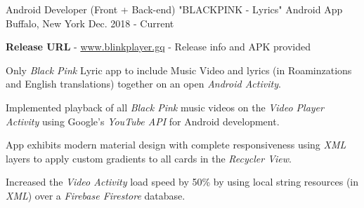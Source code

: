\begin{cventries}
\cventry
    {Android Developer (Front + Back-end)} %
    {"BLACKPINK - Lyrics" Android App} %
    {Buffalo, New York} %
    {Dec. 2018 - Current} %
    {
      \begin{cvitems} %
      {\textbf{Release URL }  -  \href{www.blinkplayer.gq}{www.blinkplayer.gq} - Release info and APK provided }
        \item \item{Only \textit{Black Pink} Lyric app to include Music Video and lyrics (in Roaminzations and English translations) together on an open \textit{Android Activity}.}
        \item {Implemented playback of all \textit{Black Pink} music videos on the \textit{Video Player Activity} using Google's \textit{YouTube API} for Android development.}
        \item {App exhibits modern material design with complete responsiveness using \textit{XML} layers to apply custom gradients to all cards in the \textit{Recycler View}.}
        \item {Increased the \textit{Video Activity} load speed by 50\% by using local string resources (in \textit{XML}) over a \textit{Firebase Firestore} database.}
      \end{cvitems}
    }

\end{cventries}